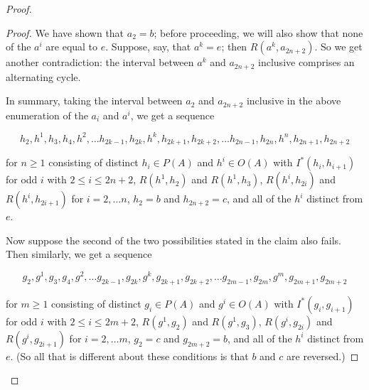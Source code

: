 \documentclass{amsart}
\theoremstyle{definition}
\theoremstyle{remark}
\numberwithin{equation}{section}
\begin{document}
\begin{proof}
\begin{proof}
We have shown that $a_2 = b$; before proceeding, we will also show that none of the $a^{i}$ are equal to $e$. Suppose, say, that $a^{k} = e$; then $R(a^{k}, a_{2n+2})$. So we get another contradiction: the interval between $a^k$ and $a_{2n+2}$ inclusive comprises an alternating cycle.

In summary, taking the interval between $a_2$ and $a_{2n+2}$ inclusive in the above enumeration of the $a_i$ and $a^{i}$, we get a sequence


$$h_{2}, h^{1}, h_{3}, h_{4}, h^{2}, \ldots h_{2k-1}, h_{2k},  h^{k}, h_{2k+1}, h_{2k+2}, \ldots h_{2n-1}, h_{2n},  h^{n}, h_{2n+1}, h_{2n+2}$$

for $n \geq 1$ consisting of distinct $h_i \in P(A)$ and $h^i \in O(A)$ with $I^{*}(h_i, h_{i+1})$ for odd $i$ with $2 \leq i \leq  2n+2$, $R(h^{1}, h_2)$ and $R(h^1, h_3)$, $R(h^i, h_{2i})$ and $R(h^i, h_{2i+1})$ for $i = 2, \ldots n $, $h_{2}= b $ and $h_{2n+2} = c$, and all of the $h^{i}$ distinct from $e$.


Now suppose the second of the two possibilities stated in the claim also fails. Then similarly, we get a sequence

$$g_{2}, g^{1}, g_{3}, g_{4}, g^{2}, \ldots g_{2k-1}, g_{2k},  g^{k}, g_{2k+1}, g_{2k+2}, \ldots g_{2m-1}, g_{2m},  g^{m}, g_{2m+1}, g_{2m+2}$$

for $m \geq 1$ consisting of distinct $g_i \in P(A)$ and $g^i \in O(A)$ with $I^{*}(g_i, g_{i+1})$ for odd $i$ with $2 \leq i \leq  2m+2$, $R(g^{1}, g_2)$ and $R(g^1, g_3)$, $R(g^i, g_{2i})$ and $R(g^i, g_{2i+1})$ for $i = 2, \ldots m $, $g_{2}= c $ and $g_{2m+2} = b$, and all of the $h^{i}$ distinct from $e$. (So all that is different about these conditions is that $b$ and $c$ are reversed.)


\end{proof}
\end{proof}
\end{document}
